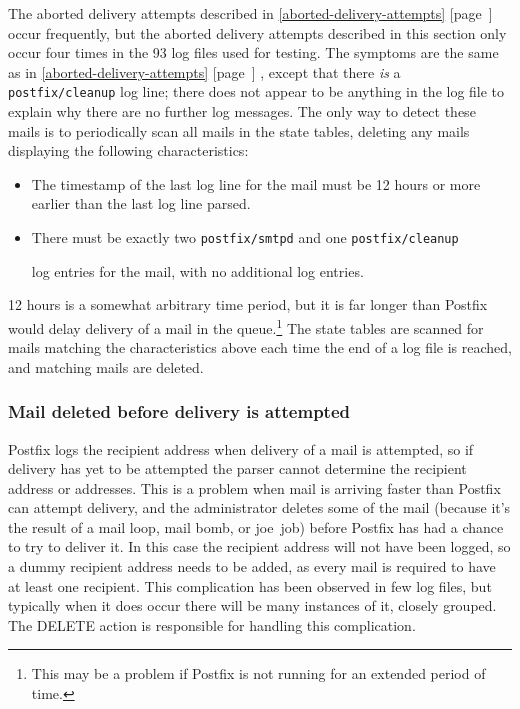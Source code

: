 \documentclass[a4paper,12pt,draft]{article}
\newcommand{\refwithpage}[1]{%
    \empty{}\ref{#1} [page~\pageref{#1}]%
}
\newcommand{\sectionref}[1]{%
    \textsection{}\refwithpage{#1}%
}
\newcommand{\daemon}[1]{%
    \texttt{postfix/#1}%
}
\newcommand{\numberOFlogFILES}[0]{%
    93%
}
\newcounter{dummy}
\begin{document}
\label{yet-more-aborted-delivery-attempts}

The aborted delivery attempts described in
\sectionref{aborted-delivery-attempts} occur frequently, but the aborted
delivery attempts described in this section only occur four times in the
\numberOFlogFILES{} log files used for testing.  The symptoms are the same
as in \sectionref{aborted-delivery-attempts}, except that there
\textit{is\/} a \daemon{cleanup} log line; there does not appear to be
anything in the log file to explain why there are no further log messages.
The only way to detect these mails is to periodically scan all mails in the
state tables, deleting any mails displaying the following characteristics:

\begin{itemize}

    \item The timestamp of the last log line for the mail must be 12 hours
        or more earlier than the last log line parsed.

    \item There must be exactly two \daemon{smtpd} and one \daemon{cleanup}
        log entries for the mail, with no additional log entries.

\end{itemize}

12 hours is a somewhat arbitrary time period, but it is far longer than
Postfix would delay delivery of a mail in the queue.\footnote{This may be a
problem if Postfix is not running for an extended period of time.}  The
state tables are scanned for mails matching the characteristics above each
time the end of a log file is reached, and matching mails are deleted.

\subsubsection{Mail deleted before delivery is attempted}

\label{Mail deleted before delivery is attempted}

Postfix logs the recipient address when delivery of a mail is attempted, so
if delivery has yet to be attempted the parser cannot determine the
recipient address or addresses.  This is a problem when mail is arriving
faster than Postfix can attempt delivery, and the administrator deletes
some of the mail (because it's the result of a mail loop, mail bomb, or
joe~job) before Postfix has had a chance to try to deliver it.  In this
case the recipient address will not have been logged, so a dummy recipient
address needs to be added, as every mail is required to have at least one
recipient.  This complication has been observed in few log files, but
typically when it does occur there will be many instances of it, closely
grouped.  The DELETE action is responsible for handling this complication.
\end{document}
